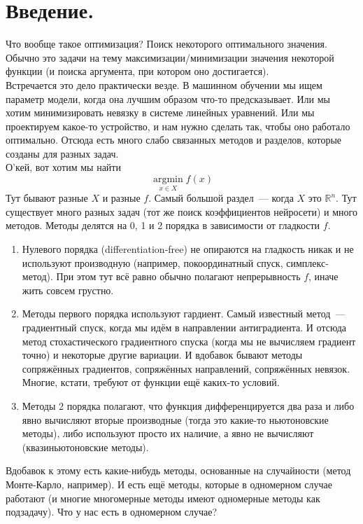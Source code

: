 \documentclass{article}
\begin{document}
    \tableofcontents
    \section{Введение.}
    Что вообще такое оптимизация? Поиск некоторого оптимального значения. Обычно это задачи на тему максимизации/минимизации значения некоторой функции (и поиска аргумента, при котором оно достигается).\\
    Встречается это дело практически везде. В машинном обучении мы ищем параметр модели, когда она лучшим образом что-то предсказывает. Или мы хотим минимизировать невязку в системе линейных уравнений. Или мы проектируем какое-то устройство, и нам нужно сделать так, чтобы оно работало оптимально. Отсюда есть много слабо связанных методов и разделов, которые созданы для разных задач.\\
    О'кей, вот хотим мы найти
    $$
    \operatorname*{argmin}_{x\in X}f(x)
    $$
    Тут бывают разные $X$ и разные $f$. Самый большой раздел~--- когда $X$ это $\mathbb R^n$. Тут существует много разных задач (тот же поиск коэффициентов нейросети) и много методов. Методы делятся на 0, 1 и 2 порядка в зависимости от гладкости $f$.
    \begin{enumerate}[1.]
        \addtocounter{enumi}{-1}
        \item Нулевого порядка (differentiation-free) не опираются на гладкость никак и не используют производную (например, покоординатный спуск, симплекс-метод). При этом тут всё равно обычно полагают непрерывность $f$, иначе жить совсем грустно.
        \item Методы первого порядка используют гардиент. Самый известный метод~--- градиентный спуск, когда мы идём в направлении антиградиента. И отсюда метод стохастического градиентного спуска (когда мы не вычисляем градиент точно) и некоторые другие вариации. И вдобавок бывают методы сопряжённых градиентов, сопряжённых направлений, сопряжённых невязок. Многие, кстати, требуют от функции ещё каких-то условий.
        \item Методы 2 порядка полагают, что функция дифференцируется два раза и либо явно вычисляют вторые производные (тогда это какие-то ньютоновские методы), либо используют просто их наличие, а явно не вычисляют (квазиньютоновские методы).
    \end{enumerate}
    Вдобавок к этому есть какие-нибудь методы, основанные на случайности (метод Монте-Карло, например). И есть ещё методы, которые в одномерном случае работают (и многие многомерные методы имеют одномерные методы как подзадачу). Что у нас есть в одномерном случае?
\end{document}
